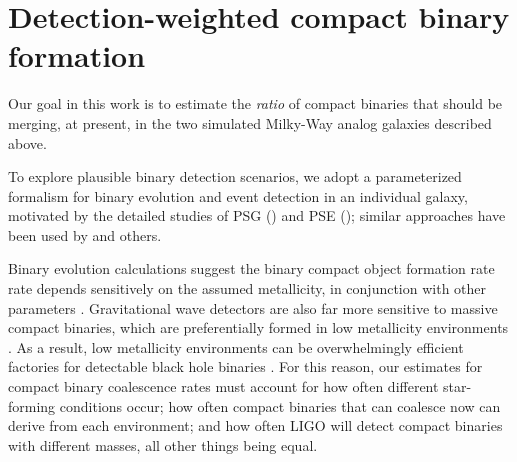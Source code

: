 \documentclass[nofootinbib,twocolumn,prd]{emulateapj}
\newcommand\abbrvPSgrb{PSG}
\newcommand\abbrvPSellipticals{PSE}
\begin{document}
\section{Detection-weighted compact binary formation}
\label{sec:model}

Our goal in this work is to estimate the \emph{ratio} of compact binaries that should be merging, at present, in the two
simulated Milky-Way analog galaxies described above.

To explore plausible binary detection scenarios, we adopt a parameterized formalism for binary evolution and event
detection in an individual galaxy, motivated by
the detailed studies of  \abbrvPSgrb{} (\cite{PSgrbs-popsyn}) and \abbrvPSellipticals{} (\cite{PSellipticals});  similar approaches have been used by
\cite{2016arXiv160508783L} and others.


Binary evolution calculations suggest the binary compact object formation rate rate depends sensitively on the assumed metallicity, in conjunction
with other parameters \citep[see,\,e.g.][and references
  therein]{popsyn-LowMetallicityImpact-Chris2008,popsyn-LIGO-SFR-2008,gwastro-EventPopsynPaper-2016}.
Gravitational wave detectors are also far more sensitive to  massive compact binaries, which are  preferentially  formed in low metallicity
environments \citep{PSellipticals,popsyn-LowMetallicityImpact2c-StarTrackRevised-2014}.  As a result, low metallicity
environments can be overwhelmingly efficient factories for detectable black hole binaries
\citep{popsyn-LowMetallicityImpact2c-StarTrackRevised-2014,gwastro-EventPopsynPaper-2016}.  
%
For this reason, our estimates for compact binary coalescence rates must account for how often  different star-forming
conditions occur;  how often compact binaries that can coalesce now can derive from each environment; and how often LIGO will detect compact
binaries with different masses, all other things being equal.
\end{document}
